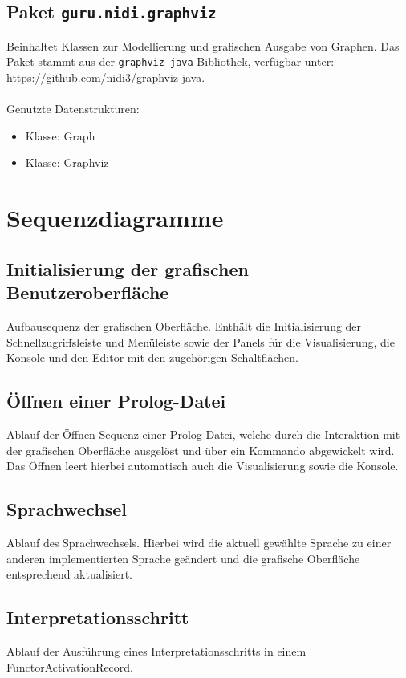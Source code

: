 \documentclass[parskip=full,11pt,twoside]{scrartcl}
\begin{document}
\subsection{Paket \texttt{guru.nidi.graphviz}}

Beinhaltet Klassen zur Modellierung und grafischen Ausgabe von Graphen. Das Paket stammt aus der \texttt{graphviz-java} Bibliothek, verfügbar unter:\\ \url{https://github.com/nidi3/graphviz-java}.\\\\Genutzte Datenstrukturen:
\begin{itemize}
	\item Klasse: Graph
	\item Klasse: Graphviz
\end{itemize}

\section{Sequenzdiagramme}
\subsection{Initialisierung der grafischen Benutzeroberfläche}
Aufbausequenz der grafischen Oberfläche. Enthält die Initialisierung der Schnellzugriffsleiste und Menüleiste sowie der Panels für die Visualisierung, die Konsole und den Editor mit den zugehörigen Schaltflächen.
\newpage
\newpage
\subsection{Öffnen einer Prolog-Datei}
Ablauf der Öffnen-Sequenz einer Prolog-Datei, welche durch die Interaktion mit der grafischen Oberfläche ausgelöst und über ein Kommando abgewickelt wird. Das Öffnen leert hierbei automatisch auch die Visualisierung sowie die Konsole.
\newpage
\newpage
\subsection{Sprachwechsel}
Ablauf des Sprachwechsels. Hierbei wird die aktuell gewählte Sprache zu einer anderen implementierten Sprache geändert und die grafische Oberfläche entsprechend aktualisiert.
\newpage
\newpage
\subsection{Interpretationsschritt}
Ablauf der Ausführung eines Interpretationsschritts in einem FunctorActivationRecord.
\newpage
\newpage
\end{document}
